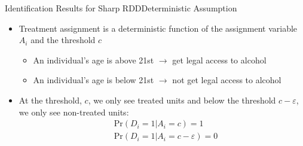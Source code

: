 \documentclass[hyperref={pdfpagelabels=false}]{beamer}
\begin{document}
\begin{frame}{Identification Results for Sharp RDD}{Deterministic Assumption}
	\begin{itemize}
		\begin{block}{Deterministic Assumption}
			\begin{equation*}
			D_i=1\{A_i\geq c\} \quad \forall i
			\end{equation*}
		\end{block}
		
		\item Treatment assignment is a deterministic function of the assignment variable $A_{i}$ and the threshold $c$	
		\vspace{0.2cm}
		\begin{itemize}
			\item An individual's age is above 21st $\rightarrow$ get legal access to alcohol
			\vspace{0.2cm}
			\item An individual's age is below 21st $\rightarrow$ not get legal access to alcohol
		\end{itemize}
		\vspace{0.2cm}
		\item At the threshold, $c$, we only see treated units and below the threshold $c-\varepsilon$, we only see non-treated units:
		\begin{equation*}
		\begin{aligned}
		& \mathrm{Pr}(D_i=1|A_i=c)=1 \\
		& \mathrm{Pr}(D_i=1|A_i=c-\varepsilon)=0
		\end{aligned}
		\end{equation*}
	\end{itemize}
\end{frame}
\end{document}
